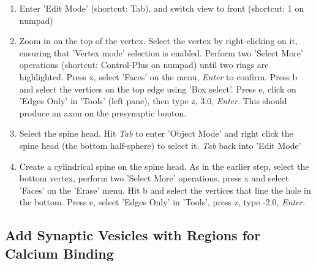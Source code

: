 \documentclass[twoside,a4paper]{refart}
\begin{document}
\begin{enumerate}

\item   Enter 'Edit Mode' (shortcut: Tab), and switch view to front (shortcut: 1 on numpad)

\item   Zoom in on the top of the vertex. Select the vertex by right-clicking on it, ensuring that 'Vertex mode' selection is enabled. Perform two 'Select More' operations (shortcut: Control-Plus on numpad) until two rings are highlighted. Press x, select 'Faces' on the menu, \textit{Enter} to confirm. Press b and select the vertices on the top edge using 'Box select'. Press e, click on 'Edges Only' in 'Tools' (left pane), then type z, 3.0, \textit{Enter}. This should produce an axon on the presynaptic bouton.

\item   Select the spine head. Hit \textit{Tab} to enter 'Object Mode' and right click the spine head (the bottom half-sphere) to select it. \textit{Tab} back into 'Edit Mode'

\item   Create a cylindrical spine on the spine head. As in the earlier step, select the bottom vertex, perform two 'Select More' operations, press x and select 'Faces' on the 'Erase' menu. Hit b and select the vertices that line the hole in the bottom. Press e, select 'Edges Only' in 'Tools', press z, type -2.0, \textit{Enter}. 

\end{enumerate}

\subsection{Add Synaptic Vesicles with Regions for Calcium Binding}
\end{document}
